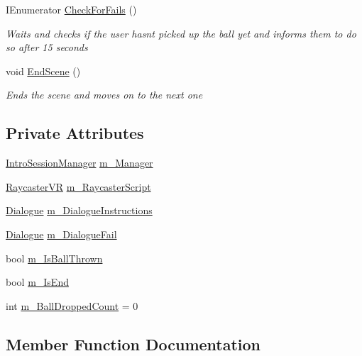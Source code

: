 \begin{DoxyCompactItemize}
I\+Enumerator \mbox{\hyperlink{class_stage5_ab2e381c47a40f2726df0579f07bbb7fa}{Check\+For\+Fails}} ()
\begin{DoxyCompactList}\small\item\em Waits and checks if the user hasn\textquotesingle{}t picked up the ball yet and informs them to do so after 15 seconds \end{DoxyCompactList}\item 
void \mbox{\hyperlink{class_stage5_a648d6f5b7fe35e437694c010f8b4704f}{End\+Scene}} ()
\begin{DoxyCompactList}\small\item\em Ends the scene and moves on to the next one \end{DoxyCompactList}\end{DoxyCompactItemize}
\subsection*{Private Attributes}
\begin{DoxyCompactItemize}
\item 
\mbox{\hyperlink{class_intro_session_manager}{Intro\+Session\+Manager}} \mbox{\hyperlink{class_stage5_a7f6c6334d936500cd2c2c0510c3b9c8f}{m\+\_\+\+Manager}}
\item 
\mbox{\hyperlink{class_v_r_standard_assets_1_1_utils_1_1_raycaster_v_r}{Raycaster\+VR}} \mbox{\hyperlink{class_stage5_a1bb51309966ab470df9b3229046332e1}{m\+\_\+\+Raycaster\+Script}}
\item 
\mbox{\hyperlink{class_dialogue}{Dialogue}} \mbox{\hyperlink{class_stage5_a74caa3de0c1bef9476af55d329b542a3}{m\+\_\+\+Dialogue\+Instructions}}
\item 
\mbox{\hyperlink{class_dialogue}{Dialogue}} \mbox{\hyperlink{class_stage5_abb8bc51393ba9348ad464d7bd0f97e5d}{m\+\_\+\+Dialogue\+Fail}}
\item 
bool \mbox{\hyperlink{class_stage5_a51c1395cdadb3828f7682f59560ee6b1}{m\+\_\+\+Is\+Ball\+Thrown}}
\item 
bool \mbox{\hyperlink{class_stage5_a84c27763b680c4c9086c5facf3302e1d}{m\+\_\+\+Is\+End}}
\item 
int \mbox{\hyperlink{class_stage5_a845a29cee8d9154d559ca52b8f0fd788}{m\+\_\+\+Ball\+Dropped\+Count}} = 0
\end{DoxyCompactItemize}


\subsection{Member Function Documentation}
\mbox{\label{class_stage5_a0d60946476d491834a1f2e41e74da306}} 
